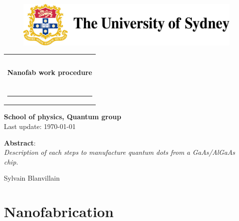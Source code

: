 \documentclass[12pt,a4paper]{report}
\begin{document}
\thispagestyle{empty}

\begin{figure}[tl]
\includegraphics[scale=0.4]{fig/usydlogo.jpg}
\end{figure}

\begin{tabular}{c}
\\
\\
\\
\begin{huge}
\textbf{Nanofab work procedure}
\end{huge}
\\
\\
\rule{14cm}{1mm}
\end{tabular}

\vspace{2cm}

\begin{flushright}

\begin{Large}
\textbf{School of physics, Quantum group}\\
\vspace{0.5cm}
Last update: \today
\end{Large}
\end{flushright}

\vspace{4cm}

\noindent \textbf{Abstract}:\\
\textit{Description of each steps to manufacture quantum dots from a GaAs/AlGaAs chip.}\\

\begin{flushright}
Sylvain Blanvillain
\end{flushright}

\newpage

\chapter{Nanofabrication}
\end{document}
